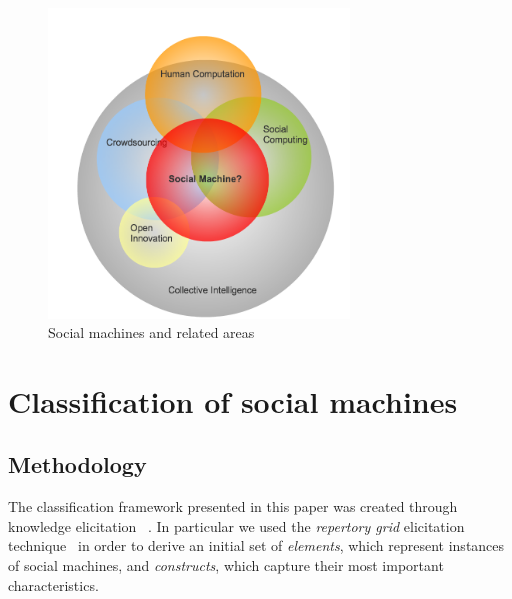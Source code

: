 \documentclass{sig-alternate}
\begin{document}
\begin{figure}[htb]
\begin{center}
\includegraphics[width=8cm]{img/socialmachinescope.png}
\caption{Social machines and related areas} \label{social machine}
\end{center}
\end{figure}

\section{Classification of social machines}


\subsection{Methodology} \label{meth}

The classification framework presented in this paper was created through knowledge elicitation ~\cite{knowledgeelicitation}. In particular we used the {\it repertory grid} elicitation
technique~\cite{kelly} in order to derive an initial set of {\it elements}, which represent instances of social machines, and {\it constructs}, which capture their most important characteristics.
\end{document}
